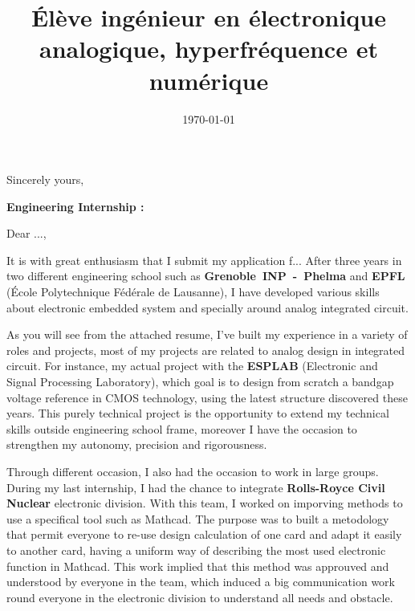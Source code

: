 \documentclass[11pt,a4paper]{moderncv}
\title{Élève ingénieur en électronique analogique, hyperfréquence et numérique}
\begin{document}

\date{\today} %
\opening{} %
\closing{Sincerely yours,} %

\makelettertitle %
\justify

\textbf{Engineering Internship :  }
\newline{}

Dear ...,\newline{}

\hspace{0.8cm} It is with great enthusiasm that I submit my application f...
After three years in two different engineering school such as \textbf{Grenoble~INP~-~Phelma} and \textbf{EPFL} (École Polytechnique Fédérale de Lausanne), I have developed various skills about electronic embedded system and specially around analog integrated circuit.


\hspace{0.8cm} As you will see from the attached resume, I’ve built my experience in a variety of roles and projects, most of my projects are related to analog design in integrated circuit. For instance, my actual project with the \textbf{ESPLAB} (Electronic and Signal Processing Laboratory), which goal is to design from scratch a bandgap voltage reference in CMOS technology, using the latest structure discovered these years. This purely technical project is the opportunity to extend my technical skills outside engineering school frame, moreover I have the occasion to strengthen my autonomy, precision and rigorousness.

\hspace{0.8cm} Through different occasion, I also had the occasion to work in large groups. During my last internship, I had the chance to integrate \textbf{Rolls-Royce Civil Nuclear} electronic division.
With this team, I worked on imporving methods to use a specifical tool such as Mathcad. 
The purpose was to built a metodology that permit everyone to re-use design calculation of one card and adapt it easily to another card, having a uniform way of describing the most used electronic function in Mathcad. 
This work implied that this method was approuved and understood by everyone in the team, which induced a big communication work round everyone in the electronic division to understand all needs and obstacle. 
\end{document}
